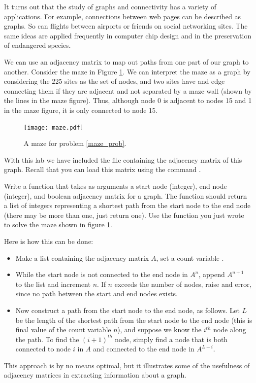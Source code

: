 It turns out that the study of graphs and connectivity has a variety of applications.
For example, connections between web pages can be described as graphs.
So can flights between airports or friends on social networking sites.
The same ideas are applied frequently in computer chip design and in the preservation of endangered species.

We can use an adjacency matrix to map out paths from one part of our graph to another.
Consider the maze in Figure \ref{maze_fig}. We can interpret the maze as a 
graph by considering the 225 sites as the set of nodes, and two sites have 
and edge connecting them if they are adjacent and not separated by a maze 
wall (shown by the lines in the maze figure). Thus, although node 0 is 
adjacent to nodes 15 and 1 in the maze figure, it is only connected to node 
15. 

\begin{figure}
\texttt{[image: maze.pdf]}
\caption{A maze for problem \ref{maze_prob}.}
\label{maze_fig}
\end{figure}

With this lab we have included the file  containing the adjacency matrix of this graph. Recall that you can load this matrix using the command 
.

\begin{problem} \label{maze_prob}
Write a function that takes as arguments a start node (integer), end
node (integer), and boolean adjacency matrix for a graph. The function should
return a list of integers representing a shortest path from the start node
to the end node (there may be more than one, just return one).
Use the function you just wrote to solve the maze shown in figure \ref{maze_fig}.

Here is how this can be done:
\begin{itemize}
\item Make a list containing the adjacency matrix $A$, set a count variable .
\item While the start node is not connected to the end node in $A^n$, 
    append $A^{n+1}$ to the list and increment $n$. If $n$ exceeds the 
    number of nodes, raise and error, since no path between the start 
    and end nodes exists. 
\item Now construct a path from the start node to the end node, as follows.
    Let $L$ be the length of the shortest path from the start node 
    to the end node (this is final value of the count variable $n$), 
    and suppose we know the $i^{th}$ node along the path. To find the 
    $(i+1)^{th}$ node, simply find a node that is both connected to node 
    $i$ in $A$ and connected to the end node in $A^{L-i}$. 
\end{itemize}

This approach is by no means optimal, but it illustrates some of the 
usefulness of adjacency matrices in extracting information about a graph.
\end{problem}

